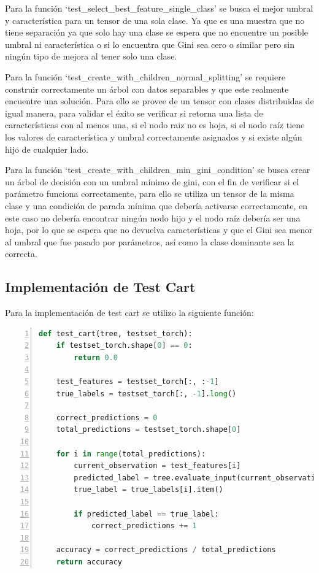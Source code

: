 \documentclass[12pt,a4paper]{article}
\begin{document}
Para la función `test_select_best_feature_single_class' se busca el mejor umbral y característica para un tensor de una sola clase.
Ya que es una muestra que no tiene separación ya que solo hay una clase se espera que no encuentre un posible umbral ni característica
o si lo encuentra que Gini sea cero o similar pero sin ningún tipo de mejora al tener solo una clase.

Para la función `test_create_with_children_normal_splitting' se requiere construir correctamente un árbol con datos separables
y que este realmente encuentre una solución.
Para ello se provee de un tensor con clases distribuidas de igual manera, para validar
el éxito se verificar si retorna una lista de características con al menos una, si el nodo raiz no es hoja,
si el nodo raíz tiene los valores de característica y umbral correctamente asignados y si existe algún hijo
de cualquier lado.

Para la función `test_create_with_children_min_gini_condition' se busca crear un árbol de decisión con un umbral minimo de gini, con el fin
de verificar si el parámetro funciona correctamente, para ello se utiliza un tensor de la misma clase y una condición de parada mínima
que debería activarse correctamente, en este caso no debería encontrar ningún nodo hijo y el nodo raíz debería ser una hoja,
por lo que se espera que no devuelva características y que el Gini sea menor al umbral que fue pasado por parámetros, así como
la clase dominante sea la correcta.

\subsection{Implementación de Test Cart}\label{subsec:implementacion-de-test-cart}

Para la implementación de test cart se utilizo la siguiente función:

    \begin{lstlisting}[language=Python, numbers=left, basicstyle=\ttfamily\small,label={lst:lstlisting9}]
  def test_cart(tree, testset_torch):
    if testset_torch.shape[0] == 0:
        return 0.0

    test_features = testset_torch[:, :-1]
    true_labels = testset_torch[:, -1].long()

    correct_predictions = 0
    total_predictions = testset_torch.shape[0]

    for i in range(total_predictions):
        current_observation = test_features[i]
        predicted_label = tree.evaluate_input(current_observation)
        true_label = true_labels[i].item()

        if predicted_label == true_label:
            correct_predictions += 1

    accuracy = correct_predictions / total_predictions
    return accuracy
    \end{lstlisting}
\end{document}
